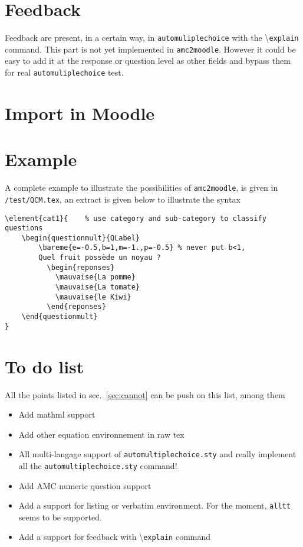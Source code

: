 \documentclass[a4paper]{article}
\newcommand{\amc}{\texttt{amc2moodle}}
\begin{document}
\section{Feedback}\label{sec:feed}
Feedback are present, in a certain way, in \texttt{automuliplechoice} with the \textbackslash\texttt{explain} command. This part is not yet implemented in \amc. However it could be easy to add it at the response or question level as other fields and bypass them for real \texttt{automuliplechoice} test.


\section{Import in Moodle}


\section{Example}
A complete example to illustrate the possibilities of \amc, is given in \texttt{/test/QCM.tex}, an extract is given below to illustrate the syntax 
\begin{verbatim}
\element{cat1}{    % use category and sub-category to classify questions
	\begin{questionmult}{QLabel}  
		\bareme{e=-0.5,b=1,m=-1.,p=-0.5} % never put b<1,
		Quel fruit possède un noyau ?
		  \begin{reponses}    
		    \mauvaise{La pomme}
		    \mauvaise{La tomate}
		    \mauvaise{le Kiwi}
		  \end{reponses}
	\end{questionmult}
}
\end{verbatim}



\section{To do list}
All the points listed in sec.~\ref{sec:cannot} can be push on this list, among them
\begin{itemize}
\item Add mathml support
\item Add other equation environnement in raw tex
\item All multi-langage support of \texttt{automultiplechoice.sty} and really implement all the \texttt{automultiplechoice.sty} command!
\item Add AMC numeric question support
\item Add a support for listing or verbatim environment. For the moment, \texttt{alltt} seems to be supported.
\item Add a support for feedback with \textbackslash\texttt{explain} command
\end{itemize}
\end{document}
